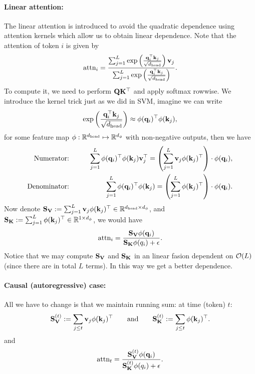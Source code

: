\documentclass[11pt]{article}  %
\begin{document}
\paragraph{Linear attention:} The linear attention is introduced to avoid the quadratic dependence using attention kernels which allow us to obtain linear dependence. 
Note that the attention of token $i$ is given by 
\begin{align*}
  \text{attn}_i = \frac{\sum_{j=1}^{L}\exp\left( \frac{\mathbf{q}_i^{\top}\mathbf{k}_j}{\sqrt{d_{\text{head}}}} \right)\mathbf{v}_j}{\sum_{j=1}^{L}\exp\left( \frac{\mathbf{q}_i^{\top}\mathbf{k}_j}{\sqrt{d_{\text{head}}}} \right)}.
\end{align*}
To compute it, we need to perform $\mathbf{Q}\mathbf{K}^{\top}$ and apply softmax rowwise.
We introduce the kernel trick just as we did in SVM, imagine we can write 
\begin{align*}
  \exp\left( \frac{\mathbf{q}_i^{\top}\mathbf{k}_j}{\sqrt{d_{\text{head}}}} \right) \approx \phi(\mathbf{q}_i)^{\top} \phi(\mathbf{k}_j),
\end{align*}
for some feature map $\phi: \mathbb{R}^{d_{\text{head}}} \mapsto \mathbb{R}^{d_{\phi}}$ with non-negative outputs, then we have
\begin{eqnarray*}
  \text{Numerator:} \qquad && \sum_{j=1}^{L} \phi(\mathbf{q}_i)^{\top}\phi(\mathbf{k}_j) \mathbf{v}_j^{\top} = \left( \sum_{j=1}^{L}\mathbf{v}_j\phi(\mathbf{k}_j)^{\top} \right) \cdot \phi(\mathbf{q}_i), \\
  \text{Denominator:} \qquad && \sum_{j=1}^{L} \phi(\mathbf{q}_i)^{\top}\phi(\mathbf{k}_j) = \left( \sum_{j=1}^{L}\phi(\mathbf{k}_j)^{\top} \right) \cdot \phi(\mathbf{q}_i).
\end{eqnarray*}
Now denote $\mathbf{S}_{\mathbf{V}} := \sum_{j=1}^{L}\mathbf{v}_j\phi(\mathbf{k}_j)^{\top} \in \mathbb{R}^{d_{\text{head}} \times d_{\phi}}$, and $\mathbf{S}_{\mathbf{K}} := \sum_{j=1}^{L}\phi(\mathbf{k}_j)^{\top} \in \mathbb{R}^{1 \times d_{\phi}}$, we would have 
\begin{align*}
  \text{attn}_i = \frac{\mathbf{S}_{\mathbf{V}} \phi(\mathbf{q}_i)}{\mathbf{S}_{\mathbf{K}}\phi(q_i) + \epsilon}.
\end{align*}
Notice that we may compute $\mathbf{S}_{\mathbf{V}}$ and $\mathbf{S}_{\mathbf{K}}$ in an linear fasion dependent on $\mathcal{O}(L)$ (since there are in total $L$ terms).
In this way we get a better dependence.

\paragraph{Causal (autoregressive) case:}
All we have to change is that we maintain running sum: at time (token) $t$:
\begin{align*}
  \mathbf{S}_{\mathbf{V}}^{(t)} := \sum_{j\leq t}\mathbf{v}_j\phi(\mathbf{k}_j)^{\top} \qquad \text{and} \qquad \mathbf{S}_{\mathbf{K}}^{(t)} := \sum_{j\leq t}\phi(\mathbf{k}_j)^{\top}.
\end{align*}
and 
\begin{align*}
  \text{attn}_t = \frac{\mathbf{S}_{\mathbf{V}}^{(t)} \phi(\mathbf{q}_i)}{\mathbf{S}_{\mathbf{K}}^{(t)}\phi(q_i) + \epsilon}.
\end{align*}
\end{document}
